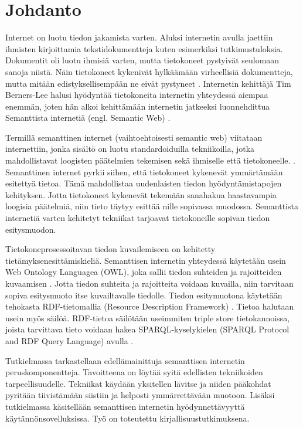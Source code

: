 \documentclass[finnish, 12pt, a4paper, elec, utf8, pdfa, online]{aaltothesis}
\begin{document}
\section{Johdanto}

\thispagestyle{empty}
Internet on luotu tiedon jakamista varten. Aluksi internetin avulla jaettiin ihmisten kirjoittamia tekstidokumentteja kuten esimerkiksi tutkimustuloksia. Dokumentit oli luotu ihmisiä varten, mutta tietokoneet pystyivät seulomaan sanoja niistä. Näin tietokoneet kykenivät hylkäämään virheellisiä dokumentteja, mutta mitään edistyksellisempään ne eivät pystyneet \cite{WWW}. Internetin kehittäjä Tim Berners-Lee halusi hyödyntää tietokoneita internetin yhteydessä aiempaa enemmän, joten hän alkoi kehittämään internetin jatkeeksi luonnehdittua Semanttista internetiä (engl. Semantic Web) \cite{Berners_visio}.

Termillä semanttinen internet (vaihtoehtoisesti semantic web) viitataan internettiin, jonka sisältö on luotu standardoiduilla tekniikoilla, jotka mahdollistavat loogisten päätelmien tekemisen sekä ihmiselle että tietokoneelle. \cite{Berners_visio}. Semanttinen internet pyrkii siihen, että tietokoneet kykenevät ymmärtämään esitettyä tietoa. Tämä mahdollistaa
uudenlaisten tiedon hyödyntämistapojen kehityksen. Jotta tietokoneet kykenevät tekemään sanahakua haastavampia loogisia päätelmiä, niin tieto täytyy esittää nille sopivassa muodossa. Semanttista internetiä varten kehitetyt tekniikat tarjoavat tietokoneille sopivan tiedon esitysmuodon.

Tietokoneprosessoitavan tiedon kuvailemiseen on kehitetty tietämyksenesittämiskieliä. Semanttisen internetin yhteydessä käytetään usein Web Ontology Languagea (OWL), joka sallii tiedon suhteiden ja rajoitteiden kuvaamisen \cite{OWL_specification}. Jotta tiedon suhteita ja rajoitteita voidaan kuvailla, niin tarvitaan sopiva esitysmuoto itse kuvailtavalle tiedolle. Tiedon esitymuotona käytetään tehokasta RDF-tietomallia (Resource Description Framework) \cite{RDF_specification}. Tietoa halutaan usein myös säilöä. RDF-tietoa säilötään useimmiten triple store tietokannoissa, joista tarvittava tieto voidaan hakea SPARQL-kyselykielen (SPARQL Protocol and RDF Query Language) avulla \cite{sparql}.

Tutkielmassa tarkastellaan edellämainittuja semanttisen internetin peruskomponentteja. Tavoitteena on löytää syitä edellisten tekniikoiden tarpeellisuudelle. Tekniikat käydään yksitellen lävitse ja niiden pääkohdat pyritään tiivistämään siistiin ja helposti ymmärrettävään muotoon. Lisäksi tutkielmassa käsitellään semanttisen internetin hyödynnettävyyttä käytännönsovelluksissa. Työ on toteutettu kirjallisuustutkimuksena.
\end{document}
